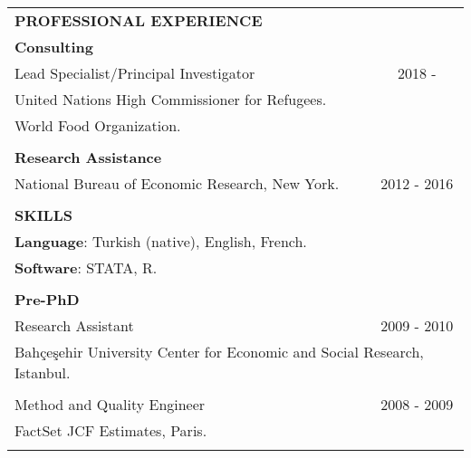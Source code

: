 \documentclass[12 pt]{article}
\begin{document}
\begin{longtable}{ccccc}
\multicolumn{5}{l}{\textbf{PROFESSIONAL EXPERIENCE}}\\[2 pt] 
\multicolumn{4}{l}{\textbf{Consulting}} \\ 
\multicolumn{4}{l}{Lead Specialist/Principal Investigator}  & \multicolumn{1}{c}{2018 - \phantom{2016}}   \\
\multicolumn{4}{l}{United Nations High Commissioner for Refugees.}   \\
\multicolumn{4}{l}{World Food Organization.}   \\

\\
\multicolumn{4}{l}{\textbf{Research Assistance}} \\ 
\multicolumn{4}{l}{National Bureau of Economic Research, New York.} & \multicolumn{1}{c}{2012 - 2016}   \\
\\



\multicolumn{5}{l}{\textbf{SKILLS}}\\[2 pt]

 \multicolumn{4}{l}{\textbf{Language}: Turkish (native), English, French.}      \\
  \multicolumn{4}{l}{\textbf{Software}: STATA, R.}\\
 \\


\multicolumn{4}{l}{\textbf{Pre-PhD}} \\ 
\multicolumn{4}{l}{Research Assistant}  & \multicolumn{1}{c}{2009 - 2010}   \\


\multicolumn{5}{l}{Bah\c{c}e\c{s}ehir University Center for Economic and Social Research, Istanbul.}   \\
\\

\multicolumn{4}{l}{Method and Quality Engineer}  & \multicolumn{1}{c}{2008 - 2009}   \\
\multicolumn{5}{l}{FactSet JCF Estimates, Paris.} \\
\\


\end{longtable}

 
\end{document}
